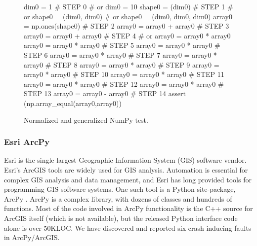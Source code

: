 \begin{figure}
{\scriptsize
\begin{code}
dim0 = 1                            \textcolor{black!60}{\# STEP 0}
\textcolor{black!60}{\#  or dim0 = 10 }
shape0 = (dim0)                     \textcolor{black!60}{\# STEP 1}
\textcolor{black!60}{\#  or shape0 = (dim0, dim0) }
\textcolor{black!60}{\#  or shape0 = (dim0, dim0, dim0) }
array0 = np.ones(shape0)            \textcolor{black!60}{\# STEP 2}
array0 = array0 + array0            \textcolor{black!60}{\# STEP 3}
array0 = array0 + array0            \textcolor{black!60}{\# STEP 4}
\textcolor{black!60}{\#  or array0 = array0 * array0 }
array0 = array0 * array0            \textcolor{black!60}{\# STEP 5}
array0 = array0 * array0            \textcolor{black!60}{\# STEP 6}
array0 = array0 * array0            \textcolor{black!60}{\# STEP 7}
array0 = array0 * array0            \textcolor{black!60}{\# STEP 8}
array0 = array0 * array0            \textcolor{black!60}{\# STEP 9}
array0 = array0 * array0            \textcolor{black!60}{\# STEP 10}
array0 = array0 * array0            \textcolor{black!60}{\# STEP 11}
array0 = array0 * array0            \textcolor{black!60}{\# STEP 12}
array0 = array0 * array0            \textcolor{black!60}{\# STEP 13}
array0 = array0 - array0            \textcolor{black!60}{\# STEP 14}
assert (np.array\_equal(array0,array0))
\end{code}
}
\caption{Normalized and generalized NumPy test.}
\label{numpynormgen}
\end{figure}

\subsubsection{Esri ArcPy}

Esri is the single
largest Geographic Information System (GIS) software vendor.  Esri's ArcGIS tools are widely
used for GIS analysis.  Automation is essential for complex GIS analysis and
data management, and Esri has long provided tools
for programming GIS software systems.  One such tool
is a Python site-package, ArcPy \cite{ArcPy}.  ArcPy is a complex library,
with dozens of classes and hundreds of functions.  Most of the code involved in ArcPy
functionality is the C++ source for ArcGIS itself (which is not
available), but the released Python interface code alone is over 50KLOC.
We have  discovered and reported six crash-inducing faults in
ArcPy/ArcGIS.  

